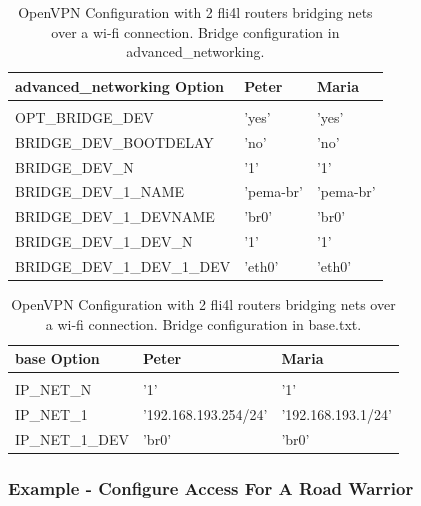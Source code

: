 \begin{table}[htbp]
  \begin{scriptsize}
    \begin{tabular}{lll}
      advanced\_networking Option  & Peter           & Maria       \\
      \hline \\
      OPT\_BRIDGE\_DEV             & 'yes'           & 'yes'       \\
      BRIDGE\_DEV\_BOOTDELAY       & 'no'            & 'no'        \\
      BRIDGE\_DEV\_N               & '1'             & '1'         \\
      BRIDGE\_DEV\_1\_NAME         & 'pema-br'       & 'pema-br'   \\
      BRIDGE\_DEV\_1\_DEVNAME      & 'br0'           & 'br0'       \\
      BRIDGE\_DEV\_1\_DEV\_N       & '1'             & '1'         \\
      BRIDGE\_DEV\_1\_DEV\_1\_DEV  & 'eth0'          & 'eth0'      \\
    \end{tabular}
  \end{scriptsize}
  \caption{OpenVPN Configuration with 2 fli4l routers bridging nets over a wi-fi connection. Bridge configuration in advanced\_networking.}
\end{table}

\begin{table}[htbp]
  \begin{scriptsize}
    \begin{tabular}{lll}
      base Option  & Peter           & Maria       \\
      \hline \\
      IP\_NET\_N            & '1'                   & '1'                    \\
      IP\_NET\_1            & '192.168.193.254/24'  & '192.168.193.1/24'     \\
      IP\_NET\_1\_DEV       & 'br0'                 & 'br0'                  \\
    \end{tabular}
  \end{scriptsize}
  \caption{OpenVPN Configuration with 2 fli4l routers bridging nets over a wi-fi connection. Bridge configuration in base.txt.}
\end{table}

\subsubsection{Example - Configure Access For A Road Warrior}

